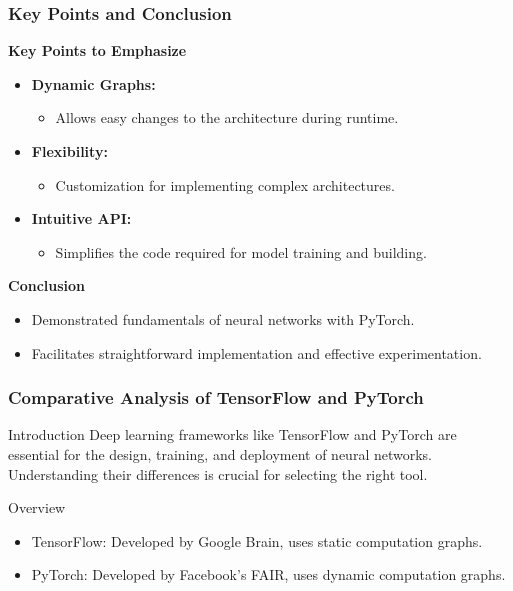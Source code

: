 \documentclass[aspectratio=169]{beamer}
\begin{document}
\begin{frame}
    \frametitle{Key Points and Conclusion}
    \textbf{Key Points to Emphasize}
    \begin{itemize}
        \item \textbf{Dynamic Graphs:} 
        \begin{itemize}
            \item Allows easy changes to the architecture during runtime.
        \end{itemize}
        \item \textbf{Flexibility:} 
        \begin{itemize}
            \item Customization for implementing complex architectures.
        \end{itemize}
        \item \textbf{Intuitive API:} 
        \begin{itemize}
            \item Simplifies the code required for model training and building.
        \end{itemize}
    \end{itemize}

    \textbf{Conclusion}
    \begin{itemize}
        \item Demonstrated fundamentals of neural networks with PyTorch.
        \item Facilitates straightforward implementation and effective experimentation.
    \end{itemize}
\end{frame}

\begin{frame}[fragile]
    \frametitle{Comparative Analysis of TensorFlow and PyTorch}
    \begin{block}{Introduction}
        Deep learning frameworks like TensorFlow and PyTorch are essential for the design, training, and deployment of neural networks. Understanding their differences is crucial for selecting the right tool.
    \end{block}
    
    \begin{block}{Overview}
        \begin{itemize}
            \item TensorFlow: Developed by Google Brain, uses static computation graphs.
            \item PyTorch: Developed by Facebook's FAIR, uses dynamic computation graphs.
        \end{itemize}
    \end{block}
\end{frame}
\end{document}
